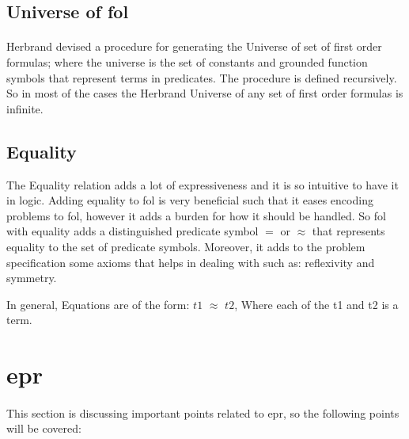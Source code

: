 \subsection{Universe of \ac{fol}}
\paragraph{}
Herbrand devised a procedure for generating the Universe of set of first order formulas; where the universe is the set of constants and grounded function symbols that represent terms in predicates. The procedure is defined recursively. So in most of the cases the Herbrand Universe of any set of first order formulas is infinite.


\subsection{Equality}
The Equality relation adds a lot of expressiveness and it is so intuitive to have it in logic. Adding equality to \ac{fol} is very beneficial such that it eases encoding problems to \ac{fol}, however it adds a burden for how it should be handled. So \ac{fol} with equality adds a distinguished predicate symbol $=$ or $\approx$ that represents equality to the set of predicate symbols. Moreover, it adds to the problem specification some axioms that helps in dealing with such as: reflexivity and symmetry.


In general, Equations are of the form: $t1$ $\approx$ $t2$, Where each of the t1 and t2 is a term.


\begin{comment}
One representation of Herbrand Theorem states that:
"Let F be a formula in CNF. The formula F is unsatisfiable iff there is an unsatisfiable set G containing only ground instances of clauses in F."


So this theorem reduces any \ac{fol} problem to an equivalent propositional problem. And this a very important reduction.
\end{comment}




\section{\acf{epr}}
\paragraph{}
This section is discussing important points related to \ac{epr}, so the following points will be covered:

